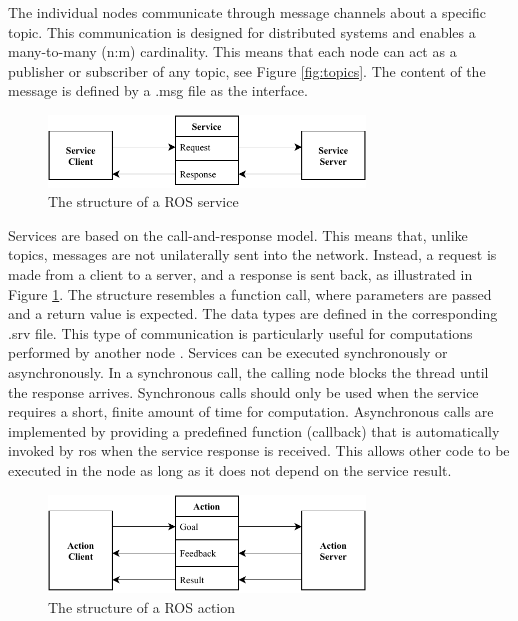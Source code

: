 The individual nodes communicate through message channels about a specific topic. This communication is designed for distributed systems and enables a many-to-many (n:m) cardinality. This means that each node can act as a publisher or subscriber of any topic, see Figure \ref{fig:topics}. The content of the message is defined by a .msg file as the interface.

\begin{figure}[h]
    \centering
    \includegraphics[width=0.75\textwidth]{figures/20_state_of_the_art/services.pdf}
    \caption{The structure of a ROS service}
    \label{fig:services}
\end{figure}

Services are based on the call-and-response model. This means that, unlike topics, messages are not unilaterally sent into the network. Instead, a request is made from a client to a server, and a response is sent back, as illustrated in Figure \ref{fig:services}. The structure resembles a function call, where parameters are passed and a return value is expected. The data types are defined in the corresponding .srv file. This type of communication is particularly useful for computations performed by another node \cite[p. 51]{quigley_programming_2015}. Services can be executed synchronously or asynchronously. In a synchronous call, the calling node blocks the thread until the response arrives. Synchronous calls should only be used when the service requires a short, finite amount of time for computation. Asynchronous calls are implemented by providing a predefined function (callback) that is automatically invoked by \gls{ros} when the service response is received. This allows other code to be executed in the node as long as it does not depend on the service result.

\begin{figure}[h]
    \centering
    \includegraphics[width=0.75\textwidth]{figures/20_state_of_the_art/actions.pdf}
    \caption{The structure of a ROS action}
    \label{fig:actions}
\end{figure}


